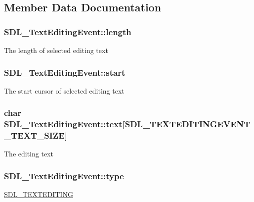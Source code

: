 \subsection{Member Data Documentation}
\hypertarget{structSDL__TextEditingEvent_adca95505c0bf212834930df58f6d1aa5}{}
\subsubsection[{length}]{ S\+D\+L\+\_\+\+Text\+Editing\+Event\+::length}\label{structSDL__TextEditingEvent_adca95505c0bf212834930df58f6d1aa5}
The length of selected editing text \hypertarget{structSDL__TextEditingEvent_ac6c6a00835d92b12c0ba5b78b5ad676d}{}
\subsubsection[{start}]{ S\+D\+L\+\_\+\+Text\+Editing\+Event\+::start}\label{structSDL__TextEditingEvent_ac6c6a00835d92b12c0ba5b78b5ad676d}
The start cursor of selected editing text \hypertarget{structSDL__TextEditingEvent_a29848c2e7819ea98ae8fb08543e6d420}{}
\subsubsection[{text}]{\setlength{\rightskip}{0pt plus 5cm}char S\+D\+L\+\_\+\+Text\+Editing\+Event\+::text\mbox{[}S\+D\+L\+\_\+\+T\+E\+X\+T\+E\+D\+I\+T\+I\+N\+G\+E\+V\+E\+N\+T\+\_\+\+T\+E\+X\+T\+\_\+\+S\+I\+Z\+E\mbox{]}}\label{structSDL__TextEditingEvent_a29848c2e7819ea98ae8fb08543e6d420}
The editing text \hypertarget{structSDL__TextEditingEvent_a198e6df194a3bf12cf5f82553e84c7cb}{}
\subsubsection[{type}]{ S\+D\+L\+\_\+\+Text\+Editing\+Event\+::type}\label{structSDL__TextEditingEvent_a198e6df194a3bf12cf5f82553e84c7cb}
\hyperlink{SDL__events_8h_a3b589e89be6b35c02e0dd34a55f3fccaa1b80c465df69c0b6d06f026ce7a230e3}{S\+D\+L\+\_\+\+T\+E\+X\+T\+E\+D\+I\+T\+I\+N\+G} \hypertarget{structSDL__TextEditingEvent_a23b3e414cf7a7ccc547b7595ca930049}{}

